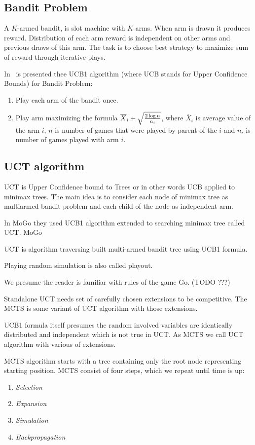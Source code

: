 \subsection{Bandit Problem}
A $K$-armed bandit, is slot machine with $K$ arms. When arm is drawn it
produces reward. Distribution of each arm reward is independent on other arms
and previous draws of this arm. The task is to choose best strategy to maximize
sum of reward through iterative plays.~\cite{MoGo,MultiarmedBandit}

In~\cite{MultiarmedBandit} is presented thee UCB1 algorithm (where UCB stands for Upper Confidence Bounds) for Bandit Problem:

\begin{enumerate}
\item Play each arm of the bandit once.
\item Play arm maximizing the formula $\overline X_i + \sqrt{2 \log n \over n_i}$,
	  where $\overline X_i$ is average value of the arm $i$, $n$ is number
	  of games that were played by parent of the $i$ and $n_i$ is number of
	  games played with arm $i$.
\end{enumerate}


\subsection{UCT algorithm}
UCT is Upper Confidence bound to Trees or in other words UCB applied to minimax
trees. The main idea is to consider each node of minimax tree as multiarmed
bandit problem and each child of the node as independent arm.

In MoGo they used UCB1 algorithm extended to searching minimax tree called UCT.
MoGo \cite{MoGo}

UCT is algorithm traversing built multi-armed bandit tree using UCB1 formula.

Playing random simulation is also called playout.

We presume the reader is familiar with rules of the game Go. (TODO ???)
	
Standalone UCT needs set of carefully chosen extensions to be competitive. The
MCTS is some variant of UCT algorithm with those extensions.

UCB1 formula itself presumes the random involved variables are identically distributed and independent which is not true in UCT.
As MCTS we call UCT algorithm with various of extensions.

MCTS algorithm starts with a tree containing only the root node representing starting position.
MCTS consist of four steps, which we repeat until time is up:
\begin{enumerate}
\item \emph{Selection}
\item \emph{Expansion}
\item \emph{Simulation}
\item \emph{Backpropagation}
\end{enumerate}
\cite{progressive-strategies}

